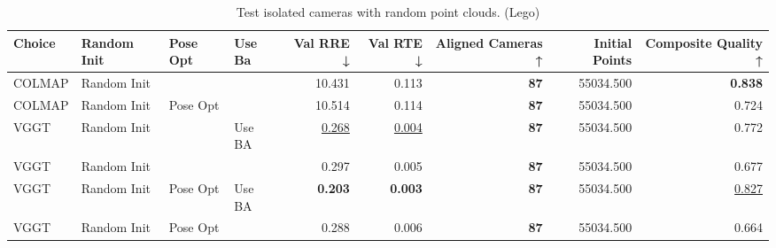 \begin{table}[H]
\caption{Test isolated cameras with random point clouds. (Lego)}
\label{tab:06_isolated_cams_lego}
\small
\begin{tabular}{llllrrrrr}
\toprule
Choice & Random Init & Pose Opt & Use Ba & Val RRE ↓ & Val RTE ↓ & Aligned Cameras ↑ & Initial Points & Composite Quality ↑ \\
\midrule
COLMAP & Random Init &  &  & 10.431 & 0.113 & \textbf{87} & 55034.500 & \textbf{0.838} \\
COLMAP & Random Init & Pose Opt &  & 10.514 & 0.114 & \textbf{87} & 55034.500 & 0.724 \\
VGGT & Random Init &  & Use BA & \underline{0.268} & \underline{0.004} & \textbf{87} & 55034.500 & 0.772 \\
VGGT & Random Init &  &  & 0.297 & 0.005 & \textbf{87} & 55034.500 & 0.677 \\
VGGT & Random Init & Pose Opt & Use BA & \textbf{0.203} & \textbf{0.003} & \textbf{87} & 55034.500 & \underline{0.827} \\
VGGT & Random Init & Pose Opt &  & 0.288 & 0.006 & \textbf{87} & 55034.500 & 0.664 \\
\bottomrule
\end{tabular}
\end{table}